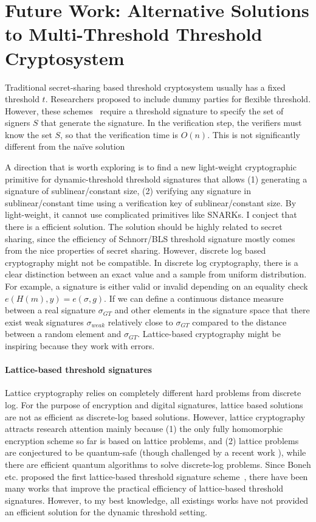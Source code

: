 \section{Future Work: Alternative Solutions to Multi-Threshold Threshold Cryptosystem} \label{sec:multi-threshold}

Traditional secret-sharing based threshold cryptosystem usually has a fixed threshold $t$. Researchers proposed to include dummy parties for flexible threshold. However, these schemes~\cite{DBLP:conf/crypto/DelerableeP08} require a threshold signature to specify the set of signers $S$ that generate the signature. In the verification step, the verifiers must know the set $S$, so that the verification time is $O(n)$. This is not significantly different from the na\"ive solution 

A direction that is worth exploring is to find a new light-weight cryptographic primitive for dynamic-threshold threshold signatures that allows (1) generating a signature of sublinear/constant size, (2) verifying any signature in sublinear/constant time using a verification key of sublinear/constant size. By light-weight, it cannot use complicated primitives like SNARKs. I conject that there is a efficient solution. The solution should be highly related to secret sharing, since the efficiency of Schnorr/BLS threshold signature mostly comes from the nice properties of secret sharing. However, discrete log based cryptography might not be compatible. In discrete log cryptography, there is a clear distinction between an exact value and a sample from uniform distribution. For example, a signature is either valid or invalid depending on an equality check $e(H(m), y)=e(\sigma, g)$. If we can define a continuous distance measure between a real signature $\sigma_{GT}$ and other elements in the signature space that there exist weak signatures $\sigma_{weak}$ relatively close to $\sigma_{GT}$ compared to the distance between a random element and $\sigma_{GT}$. Lattice-based cryptography might be inspiring because they work with errors. 

\paragraph{Lattice-based threshold signatures} Lattice cryptography relies on completely different hard problems from discrete log. For the purpose of encryption and digital signatures, lattice based solutions are not as efficient as discrete-log based solutions. However, lattice cryptography attracts research attention mainly because (1) the only fully homomorphic encryption scheme so far is based on lattice problems, and (2) lattice problems are conjectured to be quantum-safe (though challenged by a recent work \cite{cryptoeprint:2024/555}), while there are efficient quantum algorithms to solve discrete-log problems. Since Boneh etc. proposed the first lattice-based threshold signature scheme~\cite{DBLP:conf/crypto/BonehGGJKRS18}, there have been many works that improve the practical efficiency of lattice-based threshold signatures. However, to my best knowledge, all existings works have not provided an efficient solution for the dynamic threshold setting. 